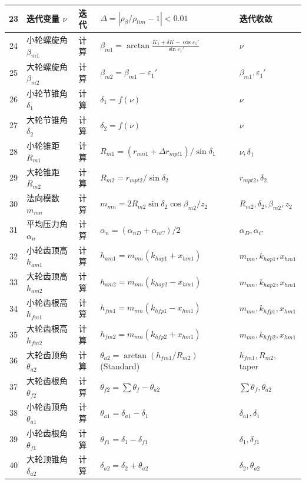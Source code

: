 ﻿\documentclass{article}
\begin{document}
\begin{table}[htbp]
\begin{tabular}{@{}cp{2.3cm}p{1.2cm}p{6cm}p{4cm}@{}}
23 & 迭代变量 $\nu$ & 迭代 & $\Delta=|\rho_\beta/\rho_{lim}-1|<0.01$ & 迭代收敛 \\
\midrule
24 & 小轮螺旋角 $\beta_{m1}$ & 计算 & $\beta_{m1} = \arctan\frac{K_1 + \delta K - \cos\varepsilon_1'}{\sin\varepsilon_1'}$ & $\nu$ \\
25 & 大轮螺旋角 $\beta_{m2}$ & 计算 & $\beta_{m2} = \beta_{m1} - \varepsilon_1'$ & $\beta_{m1}, \varepsilon_1'$ \\
26 & 小轮节锥角 $\delta_1$ & 计算 & $\delta_1 = f(\nu)$ & $\nu$ \\
27 & 大轮节锥角 $\delta_2$ & 计算 & $\delta_2 = f(\nu)$ & $\nu$ \\
28 & 小轮锥距 $R_{m1}$ & 计算 & $R_{m1} = (r_{mn1} + \Delta r_{mpt1})/\sin\delta_1$ & $\nu, \delta_1$ \\
29 & 大轮锥距 $R_{m2}$ & 计算 & $R_{m2} = r_{mpt2}/\sin\delta_2$ & $r_{mpt2}, \delta_2$ \\
\midrule
30 & 法向模数 $m_{mn}$ & 计算 & $m_{mn} = 2R_{m2}\sin\delta_2\cos\beta_{m2}/z_2$ & $R_{m2}, \delta_2, \beta_{m2}, z_2$ \\
31 & 平均压力角 $\alpha_n$ & 计算 & $\alpha_n = (\alpha_{nD} + \alpha_{nC})/2$ & $\alpha_D, \alpha_C$ \\
\midrule
32 & 小轮齿顶高 $h_{am1}$ & 计算 & $h_{am1} = m_{mn}(k_{hap1} + x_{hm1})$ & $m_{mn}, k_{hap1}, x_{hm1}$ \\
33 & 大轮齿顶高 $h_{am2}$ & 计算 & $h_{am2} = m_{mn}(k_{hap2} - x_{hm1})$ & $m_{mn}, k_{hap2}, x_{hm1}$ \\
34 & 小轮齿根高 $h_{fm1}$ & 计算 & $h_{fm1} = m_{mn}(k_{hfp1} - x_{hm1})$ & $m_{mn}, k_{hfp1}, x_{hm1}$ \\
35 & 大轮齿根高 $h_{fm2}$ & 计算 & $h_{fm2} = m_{mn}(k_{hfp2} + x_{hm1})$ & $m_{mn}, k_{hfp2}, x_{hm1}$ \\
\midrule
36 & 大轮齿顶角 $\theta_{a2}$ & 计算 & $\theta_{a2} = \arctan(h_{fm1}/R_{m2})$ (Standard) & $h_{fm1}, R_{m2}$, taper \\
37 & 大轮齿根角 $\theta_{f2}$ & 计算 & $\theta_{f2} = \sum\theta_f - \theta_{a2}$ & $\sum\theta_f, \theta_{a2}$ \\
38 & 小轮齿顶角 $\theta_{a1}$ & 计算 & $\theta_{a1} = \delta_{a1} - \delta_1$ & $\delta_{a1}, \delta_1$ \\
39 & 小轮齿根角 $\theta_{f1}$ & 计算 & $\theta_{f1} = \delta_1 - \delta_{f1}$ & $\delta_1, \delta_{f1}$ \\
\midrule
40 & 大轮顶锥角 $\delta_{a2}$ & 计算 & $\delta_{a2} = \delta_2 + \theta_{a2}$ & $\delta_2, \theta_{a2}$ \\

\end{tabular}
\end{table}
\end{document}
